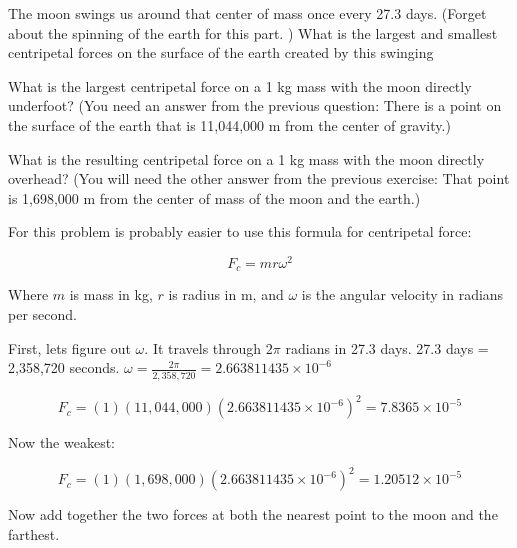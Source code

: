 \begin{Exercise}[title={Life Among the Orbits 5: Lunar Centripetal Force}, label=life-orbits5]

The moon swings us around that center of mass once every 27.3 days.  (Forget about the spinning of the earth for this part. )  What is the largest and smallest centripetal forces on the surface of the earth created by this swinging

What is the largest centripetal force on a 1 kg mass with the moon directly underfoot? (You need an answer from the previous question: There is a point on the surface of the earth that is 11,044,000 m from the center of gravity.)

What is the resulting centripetal force
on a 1 kg mass with the moon directly overhead?  (You will need the other answer from the previous exercise: That point is 1,698,000 m from the center of mass of the moon and the earth.)

For this problem is probably easier to use this formula for centripetal force:

$$F_c = m r \omega^2$$

Where $m$ is mass in kg,  $r$ is radius in m,  and $\omega$ is the angular velocity in radians per second.

\end{Exercise}

\begin{Answer}[ref=life-orbits5]

First,  lets figure out $\omega$.   It travels through $2\pi$ radians in 27.3 days.  27.3 days = 2,358,720 seconds.    $\omega = \frac{2\pi}{2,358,720} = 2.663811435 \times 10^{-6}$

$$F_c = (1)(11,044,000)(2.663811435 \times 10^{-6})^2 = 7.8365 \times 10^{-5}$$

Now the weakest:

$$F_c = (1)(1,698,000)(2.663811435 \times 10^{-6})^2 = 1.20512 \times 10^{-5}$$

\end{Answer}


\begin{Exercise}[title={Life Among the Orbits 6: Net  Force}, label=life-orbits6]

Now add together the two forces at both the nearest point to the moon and the farthest.

\end{Exercise}

